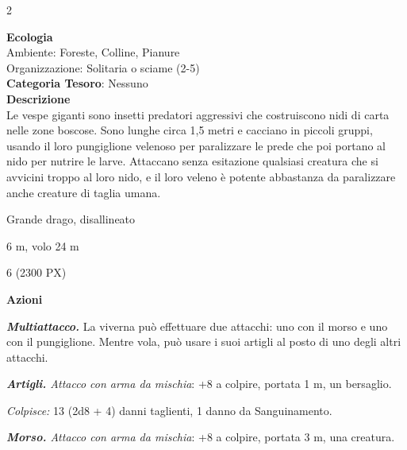 \begin{multicols}{2}
{\textbf{Ecologia}\\
Ambiente: Foreste, Colline, Pianure\\
Organizzazione: Solitaria o sciame (2-5)\\
\textbf{Categoria Tesoro}: Nessuno\\
\textbf{Descrizione}\\
Le vespe giganti sono insetti predatori aggressivi che costruiscono nidi di carta nelle zone boscose. Sono lunghe circa 1,5 metri e cacciano in piccoli gruppi, usando il loro pungiglione velenoso per paralizzare le prede che poi portano al nido per nutrire le larve. Attaccano senza esitazione qualsiasi creatura che si avvicini troppo al loro nido, e il loro veleno è potente abbastanza da paralizzare anche creature di taglia umana.

\begin{description}[noitemsep, topsep=0pt, parsep=0pt, partopsep=0pt, itemsep=1pt, leftmargin=2.35cm,  labelwidth=2.2cm, itemindent=0cm, listparindent=0pt] %
\setlength{\baselineskip}{10pt}
\item[\textbf{Taglia/Tipo}] Grande drago, disallineato
\item[\textbf{Caratt.}] 
\item[\textbf{Punti Ferita}] 
\item[\textbf{Movimento}] 6 m, volo 24 m
\item[\textbf{Tiri Salvez.}] 
\item[\textbf{Sensi}] 
\item[\textbf{Sfida}] 6 (2300 PX)
\end{description}
\smallskip

\textbf{Azioni}

\emph{\textbf{Multiattacco.}} La viverna può effettuare due attacchi: uno con il morso e uno con il pungiglione. Mentre vola, può usare i suoi artigli al posto di uno degli altri attacchi.

\emph{\textbf{Artigli.} Attacco con arma da mischia}: +8 a colpire, portata 1 m, un bersaglio.

\emph{Colpisce:} 13 (2d8 + 4) danni taglienti, 1 danno da Sanguinamento.

\emph{\textbf{Morso.} Attacco con arma da mischia}: +8 a colpire, portata 3 m, una creatura.

}
\end{multicols}
